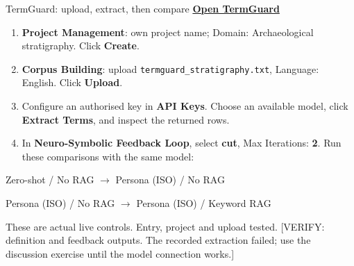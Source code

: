 \documentclass[aspectratio=169,10pt]{beamer}
\newcommand{\key}[1]{\textcolor{aegean}{\textbf{#1}}}
\newcommand{\source}[1]{\vfill{\scriptsize\color{slate}#1\par}}
\begin{document}
\begin{frame}{TermGuard: upload, extract, then compare}
  \small
  \href{https://greek-app-heaven-terminography.livelyhill-85880e66.westeurope.azurecontainerapps.io}{\key{Open TermGuard}}
  \begin{enumerate}
    \item \textbf{Project Management}: own project name; Domain: Archaeological stratigraphy. Click \textbf{Create}.
    \item \textbf{Corpus Building}: upload \texttt{termguard\_stratigraphy.txt}, Language: English. Click \textbf{Upload}.
    \item Configure an authorised key in \textbf{API Keys}. Choose an available model, click \textbf{Extract Terms}, and inspect the returned rows.
    \item In \textbf{Neuro-Symbolic Feedback Loop}, select \textbf{cut}, Max Iterations: \textbf{2}. Run these comparisons with the same model:
  \end{enumerate}
  \begin{center}
  Zero-shot / No RAG $\rightarrow$ Persona (ISO) / No RAG\par\vspace{3pt}
  Persona (ISO) / No RAG $\rightarrow$ Persona (ISO) / Keyword RAG
  \end{center}
  \source{These are actual live controls. Entry, project and upload tested.\newline
  {}[VERIFY: definition and feedback outputs. The recorded extraction failed; use the discussion exercise until the model connection works.]}
\end{frame}
\end{document}
